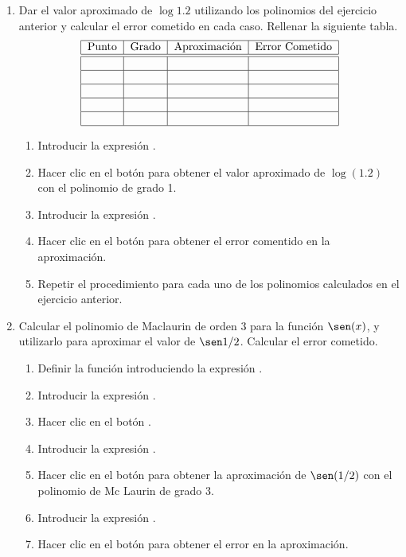 \begin{enumerate}[leftmargin=*]
\item Dar el valor aproximado de $\log 1.2$ utilizando los polinomios del ejercicio anterior y calcular el error cometido en cada caso. 
Rellenar la siguiente tabla.
\[
\begin{tabular}{|c|c|c|c|}
\hline
Punto & Grado & Aproximación
& Error Cometido \\
\hline\hline
&  &  &  \\ \hline
&  &  &  \\ \hline
&  &  &  \\ \hline
&  &  &  \\ \hline
&  &  &  \\ \hline
\end{tabular}
\]

\begin{indication}
\begin{enumerate}
\item Introducir la expresión .
\item Hacer clic en el botón  para obtener el valor aproximado de $\log(1.2)$ con el polinomio de grado
1. 
\item Introducir la expresión .
\item Hacer clic en el botón  para obtener el error comentido en la aproximación.
\item Repetir el procedimiento para cada uno de los polinomios calculados en el ejercicio anterior. 
\end{enumerate}
\end{indication}

\item Calcular el polinomio de Maclaurin de orden 3 para la función $\sen(x)$, y utilizarlo para aproximar el valor de
$\sen 1/2$.
Calcular el error cometido.

\begin{indication}
\begin{enumerate}
\item Definir la función introduciendo la expresión . 
\item Introducir la expresión .
\item Hacer clic en el botón .
\item Introducir la expresión .
\item Hacer clic en el botón  para obtener la aproximación de $\sen(1/2)$ con el polinomio de Mc Laurin
de grado 3.
\item Introducir la expresión .
\item Hacer clic en el botón  para obtener el error en la aproximación.
\end{enumerate}
\end{indication}


\end{enumerate}
